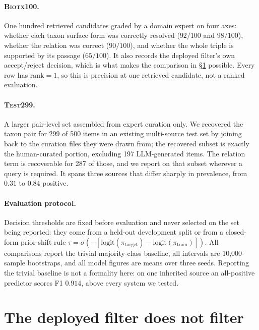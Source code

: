 \documentclass[11pt]{article}
\begin{document}
\paragraph{\textsc{Biotx100}.} One hundred retrieved candidates graded by a domain expert on four
axes: whether each taxon surface form was correctly resolved ($92/100$ and $98/100$), whether the
relation was correct ($90/100$), and whether the whole triple is supported by its passage
($65/100$). It also records the deployed filter's own accept/reject decision, which is what makes
the comparison in \S\ref{sec:nofilter} possible. Every row has $\mathrm{rank}=1$, so this is
precision at one retrieved candidate, not a ranked evaluation.

\paragraph{\textsc{Test299}.} A larger pair-level set assembled from expert curation only. We
recovered the taxon pair for 299 of 500 items in an existing multi-source test set by joining
back to the curation files they were drawn from; the recovered subset is exactly the
human-curated portion, excluding 197 LLM-generated items. The relation term is recoverable for
287 of those, and we report on that subset wherever a query is required. It spans three sources
that differ sharply in prevalence, from $0.31$ to $0.84$ positive.

\paragraph{Evaluation protocol.} Decision thresholds are fixed before evaluation and never
selected on the set being reported: they come from a held-out development split or from a
closed-form prior-shift rule $\tau = \sigma(-[\mathrm{logit}(\pi_{\mathrm{target}}) -
\mathrm{logit}(\pi_{\mathrm{train}})])$. All comparisons report the trivial majority-class
baseline, all intervals are 10{,}000-sample bootstraps, and all model figures are means over
three seeds. Reporting the trivial baseline is not a formality here: on one inherited source an
all-positive predictor scores F1 $0.914$, above every system we tested.

\section{The deployed filter does not filter}
\label{sec:nofilter}
\end{document}
